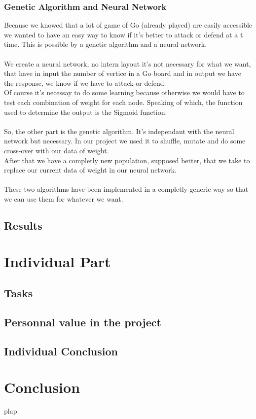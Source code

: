 \subsection{Genetic Algorithm and Neural Network}
Because we knowed that a lot of game of Go (already played) are easily
accessible we wanted to have an easy way to know if it's better to attack or
defend at a t time. This is possible by a genetic algorithm and a neural
network.\\
\\
We create a neural network, no intern layout it's not necessary for what we
want, that have in input the number of vertice in a Go board and in output we
have the response, we know if we have to attack or defend.\\
Of course it's necessay to do some learning because otherwise we would have to
test each combination of weight for each node. Speaking of which, the function
used to determine the output is the Sigmoid function.\\
\\
So, the other part is the genetic algorithm. It's independant with the
neural network but necessary. In our project we used it to shuffle, mutate and
do some cross-over with our data of weight.\\
After that we have a completly new population, supposed better, that we take to
replace our current data of weight in our neural network.\\
\\
These two algorithms have been implemented in a completly generic way so that we
can use them for whatever we want.\\

\section{Results}

\chapter{Individual Part}

\section{Tasks}

\section{Personnal value in the project}

\section{Individual Conclusion}

\chapter*{Conclusion}
plap


